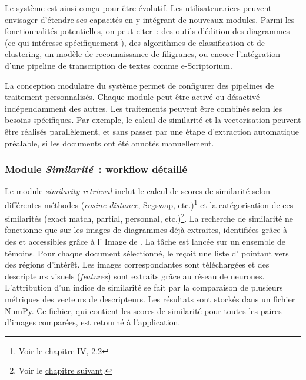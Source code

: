 
Le système est ainsi conçu pour être évolutif. Les utilisateur.rices peuvent
envisager d'étendre ses capacités en y intégrant de nouveaux modules.
Parmi les fonctionnalités potentielles, on peut citer~: des outils
d'édition des diagrammes (ce qui intéresse spécifiquement \eida), des
algorithmes de classification et de clustering, un modèle de
reconnaissance de filigranes, ou encore l'intégration d'une pipeline de
transcription de textes comme e-Scriptorium.

La conception modulaire du système permet de configurer des pipelines de
traitement personnalisés. Chaque module peut être activé ou désactivé
indépendamment des autres. Les traitements peuvent être combinés selon
les besoins spécifiques. Par exemple, le calcul de similarité et la
vectorisation peuvent être réalisés parallèlement, et sans passer par
une étape d'extraction automatique préalable, si les documents ont été
annotés manuellement.

\hypertarget{module-similarite-workflow-detaille}{%
\subsubsection{\texorpdfstring{Module \emph{Similarité}~: workflow
détaillé}{Module Similarité~: workflow détaillé}}\label{module-similarite-workflow-detaille}}

Le module \textit{similarity retrieval} inclut le calcul de scores de
similarité selon différentes méthodes (\textit{cosine distance}, Segswap, etc.)\footnote{Voir le \hyperlink{similarite}{chapitre IV, 2.2}} et la catégorisation de ces similarités (exact match,
partial, personnal, etc.)\footnote{Voir le \hyperlink{chapitre-8-interfaces}{chapitre suivant}.}. La
recherche de similarité ne fonctionne que sur les images de diagrammes
déjà extraites, identifiées grâce à des \URLs et accessibles grâce à l'\api
Image de \iiif. La tâche est lancée sur un ensemble de témoins. Pour
chaque document sélectionné, le \gpu reçoit une liste d'\URLs \iiif
pointant vers des régions d'intérêt. Les images correspondantes sont
téléchargées et des descripteurs visuels (\emph{features}) sont extraits
grâce au réseau de neurones. L'attribution d'un indice de similarité se
fait par la comparaison de plusieurs métriques des vecteurs de
descripteurs. Les résultats sont stockés dans un fichier NumPy. Ce
fichier, qui contient les scores de similarité pour toutes les paires
d'images comparées, est retourné à l'application.

